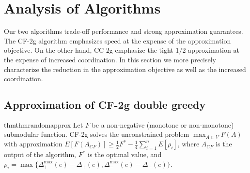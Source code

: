 \documentclass{article} %
\newcommand{\hogwild}{CF-2g}
\newcommand{\occ}{CC-2g}
\newcommand{\hogwildshort}{CF}
\newcommand{\Comments}{1}
\newcommand{\note}[2]{\ifnum\Comments=1\textcolor{#1}{#2}\fi}
\newcommand{\xinghao}[1]{\note{red}{[XP: #1]}}
\begin{document}
\section{Analysis of Algorithms \label{sec:analysis}}


Our two algorithms trade-off performance and strong approximation guarantees.
The \hogwild{} algorithm emphasizes speed at the expense of the approximation objective.
On the other hand, \occ{} emphasize the tight $1/2$-approximation at the expense of increased coordination.
In this section we more precisely characterize the reduction in the approximation objective as well as the increased coordination.



\subsection{Approximation of \hogwild{} double greedy \label{sec:analysis:hogwild}}

\begin{restatable}{thm}{thmrandomapprox}\label{thm:randomapprox} Let $F$ be a non-negative (monotone or non-monotone) submodular function.
\hogwild{} solves the unconstrained problem $\max_{A\subset V} F(A)$ with approximation
$
E[F(A_{\hogwildshort{}})] \geq \frac{1}{2}F^* - \frac{1}{4}\sum_{i=1}^n E[\rho_i]$,
where $A_{\hogwildshort{}}$ is the output of the algorithm, $F^*$ is the optimal value, and $\rho_i = \max\{\Delta_+^{\max}(e) - \Delta_+(e), \Delta_-^{\max}(e) - \Delta_-(e)\}$.
\end{restatable}
\end{document}
